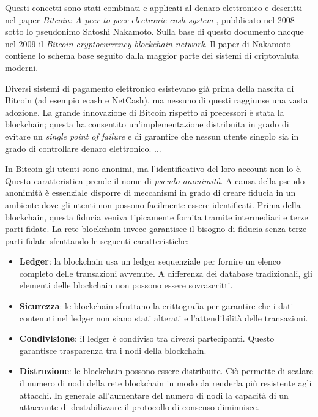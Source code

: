 Questi concetti sono stati combinati e applicati al denaro elettronico e
descritti nel paper \textit{Bitcoin: A peer-to-peer electronic cash system} \cite{nakamoto2008bitcoin}, pubblicato
nel 2008 sotto lo pseudonimo Satoshi Nakamoto. Sulla base di questo documento
nacque nel 2009 il \textit{Bitcoin cryptocurrency blockchain network}.
Il paper di Nakamoto contiene lo schema base
seguito dalla maggior parte dei sistemi di criptovaluta moderni.

Diversi sistemi di pagamento elettronico esistevano già prima della nascita di Bitcoin
(ad esempio ecash e NetCash), ma nessuno di questi raggiunse una vasta adozione.
La grande innovazione di Bitcoin rispetto ai precessori è stata la blockchain;
questa ha consentito un'implementazione distribuita in grado
di evitare un \textit{single point of failure} e di garantire che nessun utente singolo
sia in grado di controllare denaro elettronico.
...

In Bitcoin gli utenti sono anonimi, ma l'identificativo
del loro account non lo è. Questa caratteristica prende il nome di \textit{pseudo-anonimità}.
A causa della pseudo-anonimità è essenziale disporre di meccanismi in grado di creare
fiducia in un ambiente dove gli utenti non possono facilmente essere identificati. Prima
della blockchain, questa fiducia veniva tipicamente fornita tramite intermediari e terze parti fidate.
La rete blockchain invece garantisce il bisogno di fiducia senza terze-parti fidate sfruttando
le seguenti caratteristiche:
\begin{itemize}
	\item \textbf{Ledger}: la blockchain usa un ledger sequenziale per fornire un
	      elenco completo delle transazioni avvenute. A differenza dei database tradizionali,
	      gli elementi delle blockchain non possono essere sovrascritti.
	\item \textbf{Sicurezza}: le blockchain sfruttano la crittografia per garantire che i dati contenuti
	      nel ledger non siano stati alterati e l'attendibilità delle transazioni.
	\item \textbf{Condivisione}: il ledger è condiviso tra diversi partecipanti. Questo garantisce
	      trasparenza tra i nodi della blockchain.
	\item \textbf{Distruzione}: le blockchain possono essere distribuite. Ciò permette di scalare
	      il numero di nodi della rete blockchain in modo da renderla più resistente agli attacchi.
	      In generale all'aumentare del numero di nodi la capacità di un attaccante di destabilizzare il
	      protocollo di consenso diminuisce.
\end{itemize}

